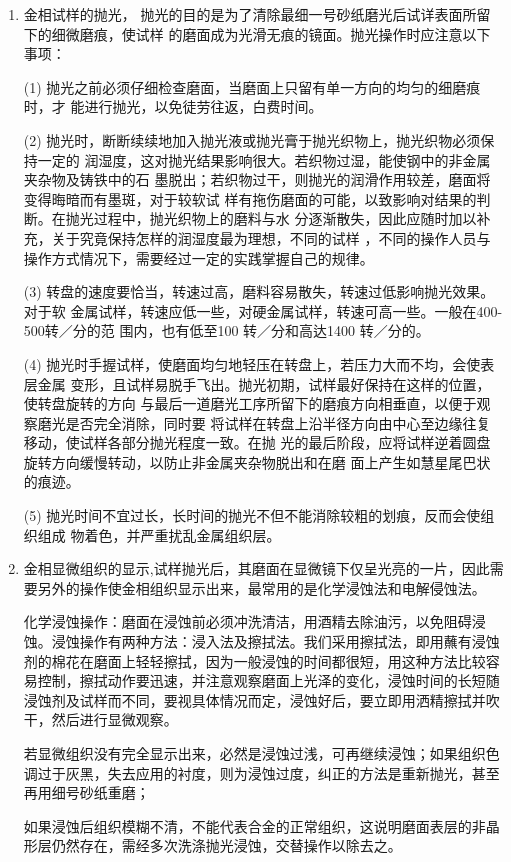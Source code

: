 \documentclass[a4paper,utf8]{article}
\begin{document}
\begin{enumerate}
        \item 金相试样的抛光， 
        抛光的目的是为了清除最细一号砂纸磨光后试详表面所留下的细微磨痕，使试样
        的磨面成为光滑无痕的镜面。抛光操作时应注意以下事项： 
        
        (1) 抛光之前必须仔细检查磨面，当磨面上只留有单一方向的均匀的细磨痕时，才
        能进行抛光，以免徒劳往返，白费时间。

        (2) 抛光时，断断续续地加入抛光液或抛光膏于抛光织物上，抛光织物必须保持一定的
        润湿度，这对抛光结果影响很大。若织物过湿，能使钢中的非金属夹杂物及铸铁中的石
        墨脱出；若织物过干，则抛光的润滑作用较差，磨面将变得晦暗而有墨斑，对于较软试
        样有拖伤磨面的可能，以致影响对结果的判断。在抛光过程中，抛光织物上的磨料与水
        分逐渐散失，因此应随时加以补充，关于究竟保持怎样的润湿度最为理想，不同的试样
        ，不同的操作人员与操作方式情况下，需要经过一定的实践掌握自己的规律。

        (3) 转盘的速度要恰当，转速过高，磨料容易散失，转速过低影响抛光效果。对于软
        金属试样，转速应低一些，对硬金属试样，转速可高一些。一般在400-500转／分的范
        围内，也有低至100 转／分和高达1400 转／分的。

        (4) 抛光时手握试样，使磨面均匀地轻压在转盘上，若压力大而不均，会使表层金属
        变形，且试样易脱手飞出。抛光初期，试样最好保持在这样的位置，使转盘旋转的方向
        与最后一道磨光工序所留下的磨痕方向相垂直，以便于观察磨光是否完全消除，同时要
        将试样在转盘上沿半径方向由中心至边缘往复移动，使试样各部分抛光程度一致。在抛
        光的最后阶段，应将试样逆着圆盘旋转方向缓慢转动，以防止非金属夹杂物脱出和在磨
        面上产生如慧星尾巴状的痕迹。

        (5) 抛光时间不宜过长，长时间的抛光不但不能消除较粗的划痕，反而会使组织组成
        物着色，并严重扰乱金属组织层。

        \item 金相显微组织的显示,试样抛光后，其磨面在显微镜下仅呈光亮的一片，因此需要另外的操作使金相组织显示出来，最常用的是化学浸蚀法和电解侵蚀法。
        
        化学浸蚀操作：磨面在浸蚀前必须冲洗清洁，用酒精去除油污，以免阻碍浸蚀。浸蚀操作有两种方法：浸入法及擦拭法。我们采用擦拭法，即用蘸有浸蚀剂的棉花在磨面上轻轻擦拭，因为一般浸蚀的时间都很短，用这种方法比较容易控制，擦拭动作要迅速，并注意观察磨面上光泽的变化，浸蚀时间的长短随浸蚀剂及试样而不同，要视具体情况而定，浸蚀好后，要立即用洒精擦拭并吹干，然后进行显微观察。

        若显微组织没有完全显示出来，必然是浸蚀过浅，可再继续浸蚀；如果组织色调过于灰黑，失去应用的衬度，则为浸蚀过度，纠正的方法是重新抛光，甚至再用细号砂纸重磨；
        
        如果浸蚀后组织模糊不清，不能代表合金的正常组织，这说明磨面表层的非晶形层仍然存在，需经多次洗涤抛光浸蚀，交替操作以除去之。
    \end{enumerate}
\end{document}
